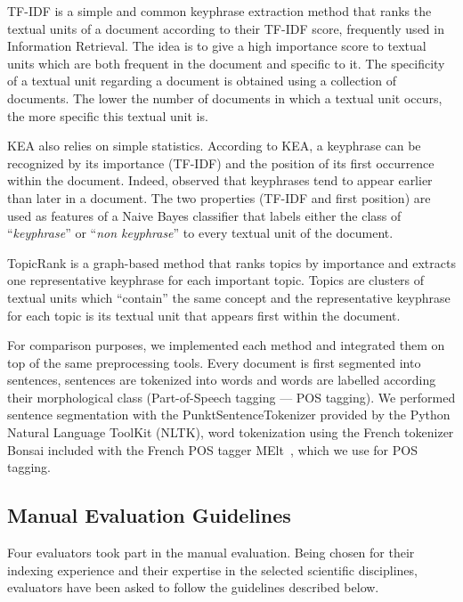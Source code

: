         TF-IDF is a simple and common keyphrase extraction method that ranks the textual units of a document according to their TF-IDF score, frequently used in Information Retrieval.
        The idea is to give a high importance score to textual units which are both frequent in the document and specific to it.
        The specificity of a textual unit regarding a document is obtained using a collection of documents.
        The lower the number of documents in which a textual unit occurs, the more specific this textual unit is.
        
        KEA also relies on simple statistics.
        According to KEA, a keyphrase can be recognized by its importance (TF-IDF) and the position of its first occurrence within the document.
        Indeed,  observed that keyphrases tend to appear earlier than later in a document.
        The two properties (TF-IDF and first position) are used as features of a Naive Bayes classifier that labels either the class of ``\textit{keyphrase}'' or ``\textit{non keyphrase}'' to every textual unit of the document.
        
        TopicRank is a graph-based method that ranks topics by importance and extracts one representative keyphrase for each important topic.
        Topics are clusters of textual units which ``contain'' the same concept and the representative keyphrase for each topic is its textual unit that appears first within the document.

        For comparison purposes, we implemented each method and integrated them on top of the same preprocessing tools.
        Every document is first segmented into sentences, sentences are tokenized into words and words are labelled according their morphological class (Part-of-Speech tagging --- POS tagging).
        We performed sentence segmentation with the PunktSentenceTokenizer provided by the Python Natural Language ToolKit (NLTK)\cite{bird2009nltk}, word tokenization using the French tokenizer Bonsai included with the French POS tagger MElt~\cite{denis2009melt}, which we use for POS tagging.

    \subsection{Manual Evaluation Guidelines}
    \label{subsec:manual_evaluation_guidelines}
        Four evaluators took part in the manual evaluation.
        Being chosen for their indexing experience and their expertise in the selected scientific disciplines, evaluators have been asked to follow the guidelines described below.
       
